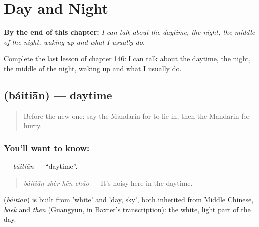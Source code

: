 
\chapter{Day and Night}
\label{ch:zh-day-and-night}

\begin{chapteropening}
\textbf{By the end of this chapter:} \emph{I can talk about the daytime, the night, the middle of the night, waking up and what I usually do.}

Complete the last lesson of chapter 146: I can talk about the daytime, the night, the middle of the night, waking up and what I usually do.
\end{chapteropening}

\section[\texorpdfstring{\zh{白天} (báitiān)}{白天 (báitiān)}]{ (báitiān) — daytime}

\label{lesson:ZH-C146-baitian}



\begin{quote}
Before the new one: say the Mandarin for to lie in, then the Mandarin for hurry.
\end{quote}

\subsection*{You'll want to know: }
\textbf{} — \emph{báitiān} — \textquotedblleft{}daytime\textquotedblright{}.

\begin{quote}
\textbf{} \emph{báitiān zhèr hěn chǎo} — It's noisy here in the daytime.
\end{quote}

\begin{cousinweb}
\textbf{} (\emph{báitiān}) is built from  'white' and  'day, sky', both inherited from Middle Chinese, \emph{baek} and \emph{then} (Guangyun, in Baxter's transcription): the white, light part of the day.
\end{cousinweb}


